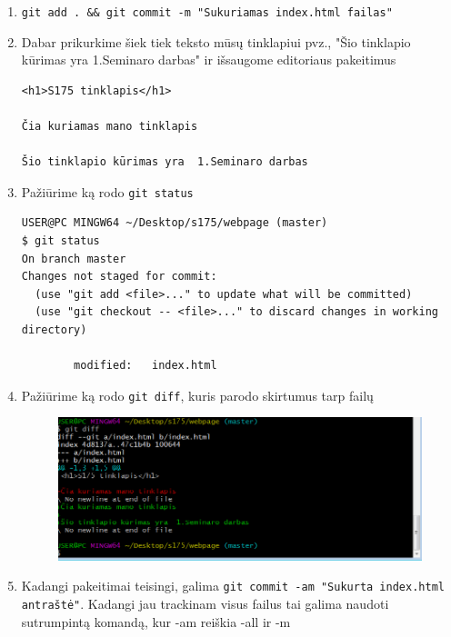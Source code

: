 \documentclass[11pt,a4paper]{article}
\begin{document}
\begin{enumerate}
\item \colorbox{listinggray}{\lstinline|git add . && git commit -m "Sukuriamas index.html failas"|}



\newpage


\item Dabar prikurkime šiek tiek teksto mūsų tinklapiui pvz., "Šio tinklapio kūrimas yra  1.Seminaro darbas" ir išsaugome editoriaus pakeitimus

\begin{lstlisting}
<h1>S175 tinklapis</h1>

Čia kuriamas mano tinklapis

Šio tinklapio kūrimas yra  1.Seminaro darbas
\end{lstlisting}

\item Pažiūrime ką rodo \colorbox{listinggray}{\lstinline|git status|}


\begin{lstlisting}
USER@PC MINGW64 ~/Desktop/s175/webpage (master)
$ git status
On branch master
Changes not staged for commit:
  (use "git add <file>..." to update what will be committed)
  (use "git checkout -- <file>..." to discard changes in working directory)

        modified:   index.html
\end{lstlisting}

\item Pažiūrime ką rodo \colorbox{listinggray}{\lstinline|git diff|}, kuris parodo skirtumus tarp failų

\begin{figure}[ht]
\center
\includegraphics[scale=0.4]{webpage_4.png}
\end{figure}

\item Kadangi pakeitimai teisingi, galima \colorbox{listinggray}{\lstinline|git commit -am "Sukurta index.html antraštė"|}. Kadangi jau trackinam visus failus tai galima naudoti sutrumpintą komandą, kur -am reiškia -all ir -m


\end{enumerate}
\end{document}
